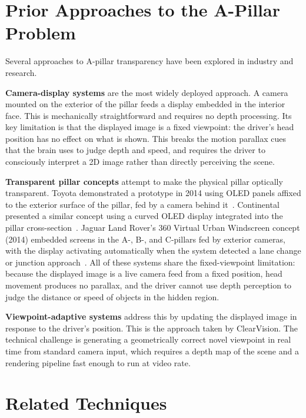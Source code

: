 \documentclass[11pt, a4paper]{report}
\begin{document}
\section{Prior Approaches to the A-Pillar Problem}

Several approaches to A-pillar transparency have been explored in industry
and research.

\textbf{Camera-display systems} are the most widely deployed approach.
A camera mounted on the exterior of the pillar feeds a display embedded in
the interior face.
This is mechanically straightforward and requires no depth processing.
Its key limitation is that the displayed image is a fixed viewpoint:
the driver's head position has no effect on what is shown.
This breaks the motion parallax cues that the brain uses to judge depth
and speed, and requires the driver to consciously interpret a 2D image
rather than directly perceiving the scene.

\textbf{Transparent pillar concepts} attempt to make the physical pillar
optically transparent.
Toyota demonstrated a prototype in 2014 using OLED panels affixed to the
exterior surface of the pillar, fed by a camera behind it~\cite{toyota_apillar}.
Continental presented a similar concept using a curved OLED display
integrated into the pillar cross-section~\cite{continental_apillar}.
Jaguar Land Rover's 360 Virtual Urban Windscreen concept (2014) embedded
screens in the A-, B-, and C-pillars fed by exterior cameras, with the
display activating automatically when the system detected a lane change
or junction approach~\cite{jlr2014pillar}.
All of these systems share the fixed-viewpoint limitation: because the
displayed image is a live camera feed from a fixed position, head movement
produces no parallax, and the driver cannot use depth perception to
judge the distance or speed of objects in the hidden region.

\textbf{Viewpoint-adaptive systems} address this by updating the displayed
image in response to the driver's position.
This is the approach taken by ClearVision.
The technical challenge is generating a geometrically correct novel
viewpoint in real time from standard camera input, which requires a depth
map of the scene and a rendering pipeline fast enough to run at video rate.

\section{Related Techniques}
\label{sec:related}
\end{document}
